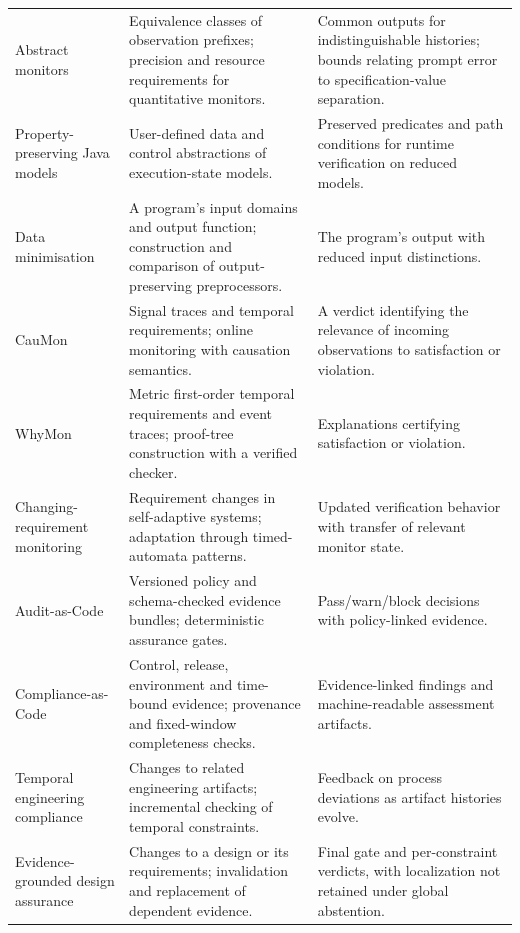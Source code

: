 \documentclass[preprint,11pt]{elsarticle}
\begin{document}
{\begin{longtable}{@{}>{\raggedright\arraybackslash}p{.235\linewidth}>{\raggedright\arraybackslash}p{.38\linewidth}>{\raggedright\arraybackslash}p{}@{}}
Abstract monitors \cite{henzinger2022abstract} & Equivalence classes of observation prefixes; precision and resource requirements for quantitative monitors. & Common outputs for indistinguishable histories; bounds relating prompt error to specification-value separation. \\
Property-preserving Java models \cite{jevitha2024abstract} & User-defined data and control abstractions of execution-state models. & Preserved predicates and path conditions for runtime verification on reduced models. \\
Data minimisation \cite{antignac2017minimisation} & A program's input domains and output function; construction and comparison of output-preserving preprocessors. & The program's output with reduced input distinctions. \\
CauMon \cite{zhang2026caumon} & Signal traces and temporal requirements; online monitoring with causation semantics. & A verdict identifying the relevance of incoming observations to satisfaction or violation. \\
WhyMon \cite{lima2024explainable} & Metric first-order temporal requirements and event traces; proof-tree construction with a verified checker. & Explanations certifying satisfaction or violation. \\
Changing-requirement monitoring \cite{carwehl2023changing} & Requirement changes in self-adaptive systems; adaptation through timed-automata patterns. & Updated verification behavior with transfer of relevant monitor state. \\
Audit-as-Code \cite{muhammad2026audit} & Versioned policy and schema-checked evidence bundles; deterministic assurance gates. & Pass/warn/block decisions with policy-linked evidence. \\
Compliance-as-Code \cite{nwekeyeng2026compliance} & Control, release, environment and time-bound evidence; provenance and fixed-window completeness checks. & Evidence-linked findings and machine-readable assessment artifacts. \\
Temporal engineering compliance \cite{ratiu2026runtime} & Changes to related engineering artifacts; incremental checking of temporal constraints. & Feedback on process deviations as artifact histories evolve. \\
Evidence-grounded design assurance \cite{hinov2026assurance} & Changes to a design or its requirements; invalidation and replacement of dependent evidence. & Final gate and per-constraint verdicts, with localization not retained under global abstention. \\

\end{longtable}}
\end{document}
